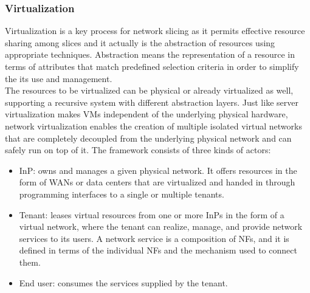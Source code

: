 \documentclass[a4paper,12pt]{report} %
\begin{document}
\subsubsection{Virtualization}
Virtualization is a key process for network slicing
as it permits effective resource sharing among
slices and it actually is the abstraction of resources
using appropriate techniques. Abstraction means the representation of a resource in terms of
attributes that match predefined selection criteria in order to simplify the its
use and management. \\
The resources to be virtualized can
be physical or already virtualized as well, supporting a
recursive system with different abstraction layers.
Just like server virtualization makes \gls{VM}s independent of the underlying
physical hardware, network virtualization enables
the creation of multiple isolated virtual networks that
are completely decoupled from the underlying physical network and can safely run on top of it.
The framework consists of three kinds of actors:
\begin{itemize}
\item \gls{InP}: owns and manages a given physical network. It offers resources in the form of
WANs or data centers that are virtualized and handed in through programming 
interfaces to a single or multiple tenants.
\end{itemize}
\begin{itemize}
\item Tenant: leases virtual resources from one or
more InPs in the form of a virtual network,
where the tenant can realize, manage, and
provide network services to its users. A network service is a composition of NFs, and it
is defined in terms of the individual NFs and
the mechanism used to connect them.
\end{itemize}
\begin{itemize}
\item End user: consumes the services
supplied by the tenant.
\end{itemize}
\end{document}
